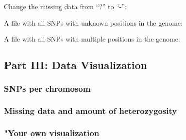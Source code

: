 \documentclass[]{article}
\begin{document}
Change the missing data from ``?'' to ``-'':

A file with all SNPs with unknown positions in the genome:

A file with all SNPs with multiple positions in the genome:

\hypertarget{part-iii-data-visualization}{%
\subsection{Part III: Data
Visualization}\label{part-iii-data-visualization}}

\hypertarget{snps-per-chromosom}{%
\subsubsection{SNPs per chromosom}\label{snps-per-chromosom}}

\hypertarget{missing-data-and-amount-of-heterozygosity}{%
\subsubsection{Missing data and amount of
heterozygosity}\label{missing-data-and-amount-of-heterozygosity}}

\hypertarget{your-own-visualization}{%
\subsubsection{"Your own visualization}\label{your-own-visualization}}
\end{document}
